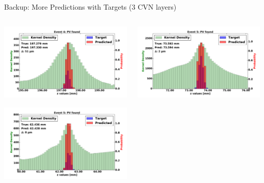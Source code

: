 \begin{frame}{Backup: More Predictions with Targets (3 CVN layers)}
  \begin{columns}[c]
        \begin{center}
            \includegraphics[width=1\textwidth,height=0.45\textwidth, trim=18 0 18 0]{images/120000_3layer_28.pdf}
    
            \includegraphics[width=1\textwidth, height=0.45\textwidth,trim=18 0 18 0]{images/120000_3layer_29.pdf}

        \end{center}
        \begin{center}
           \includegraphics[width=1\textwidth, height=0.45\textwidth, trim=18 0 18 0]{images/120000_3layer_30.pdf}
    

\end{center}
\end{columns}
\end{frame}
